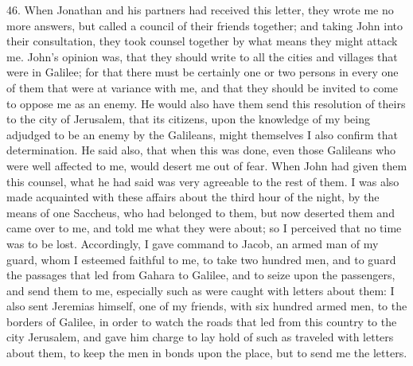 46. When Jonathan and his partners had received this letter, they wrote me
no more answers, but called a council of their friends together; and
taking John into their consultation, they took counsel together by what
means they might attack me. John's opinion was, that they should write to
all the cities and villages that were in Galilee; for that there must be
certainly one or two persons in every one of them that were at variance
with me, and that they should be invited to come to oppose me as an enemy.
He would also have them send this resolution of theirs to the city of
Jerusalem, that its citizens, upon the knowledge of my being adjudged to
be an enemy by the Galileans, might themselves I also confirm that
determination. He said also, that when this was done, even those Galileans
who were well affected to me, would desert me out of fear. When John had
given them this counsel, what he had said was very agreeable to the rest
of them. I was also made acquainted with these affairs about the third
hour of the night, by the means of one Saccheus, who had belonged to them,
but now deserted them and came over to me, and told me what they were
about; so I perceived that no time was to be lost. Accordingly, I gave
command to Jacob, an armed man of my guard, whom I esteemed faithful to
me, to take two hundred men, and to guard the passages that led from
Gahara to Galilee, and to seize upon the passengers, and send them to me,
especially such as were caught with letters about them: I also sent
Jeremias himself, one of my friends, with six hundred armed men, to the
borders of Galilee, in order to watch the roads that led from this country
to the city Jerusalem, and gave him charge to lay hold of such as traveled
with letters about them, to keep the men in bonds upon the place, but to
send me the letters.

